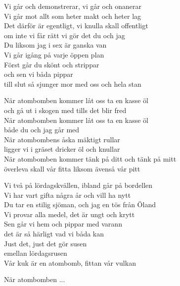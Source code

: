 \vspace{10pt}
Vi går och demonstrerar, vi går och onanerar\\
Vi går mot allt som heter makt och heter lag\\
Det därför är egentligt, vi knulla skall offentligt\\
om inte vi får rätt vi gör det du och jag\\
Du liksom jag i sex är ganska van\\
Vi går igång på varje öppen plan\\
Först går du skönt och strippar\\
och sen vi båda pippar\\
till slut så sjunger mor med oss och hela stan\par
\vspace{8pt}
När atombomben kommer låt oss ta en kasse öl\\
och gå ut i skogen med tills det blir fred\\
När atombomben kommer låt oss ta en kasse öl\\
både du och jag går med\\
När atombombens åska mäktigt rullar\\
ligger vi i gräset dricker öl och knullar\\
När atombomben kommer tänk på ditt och tänk på mitt\\
överleva skall vår fitta liksom ävenså vår pitt\par
\vspace{8pt}
Vi två på lördagskvällen, ibland går på bordellen\\
Vi har vart gifta några år och vill ha nytt\\
Du tar en stilig sjöman, och jag en tös från Öland\\
Vi provar alla medel, det är ungt och krytt\\
Sen går vi hem och pippar med varann\\
det är så härligt vad vi båda kan\\
Just det, just det gör susen\\
emellan lördagsrusen\\
Vår kuk är en atombomb, fittan vår vulkan\par
\vspace{8pt}
När atombomben ...
